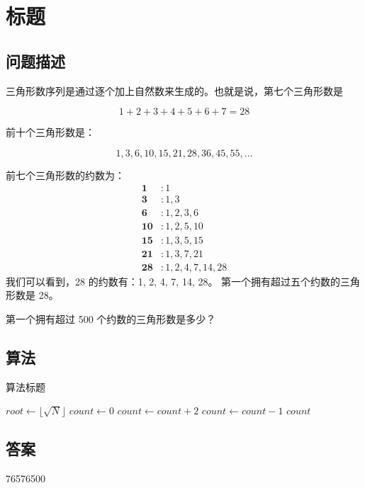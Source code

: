 \section{标题}
\subsection{问题描述}
\begin{tcolorbox}
	三角形数序列是通过逐个加上自然数来生成的。也就是说，第七个三角形数是

	\[
		1 + 2 + 3 + 4 + 5 + 6 + 7 = 28
	\]

	前十个三角形数是：

	\[
		1, 3, 6, 10, 15, 21, 28, 36, 45, 55, \ldots
	\]


	前七个三角形数的约数为：
	\begin{align*}
		\mathbf 1   & \colon 1             \\
		\mathbf 3   & \colon 1,3           \\
		\mathbf 6   & \colon 1,2,3,6       \\
		\mathbf{10} & \colon 1,2,5,10      \\
		\mathbf{15} & \colon 1,3,5,15      \\
		\mathbf{21} & \colon 1,3,7,21      \\
		\mathbf{28} & \colon 1,2,4,7,14,28
	\end{align*}
	我们可以看到，28 的约数有：1, 2, 4, 7, 14, 28。
	第一个拥有超过五个约数的三角形数是 28。

	第一个拥有超过 500 个约数的三角形数是多少？
\end{tcolorbox}

\subsection{算法}
\begin{algorithm}
	\caption{算法标题}
	\begin{algorithmic}[1]
	\State $root \gets \lfloor \sqrt{N} \rfloor$
	\State $ count \gets 0$
	\State $count \gets count + 2$
	\EndFor
	\State $count \gets count - 1$
	\EndIf
	\Return $count$
	\EndFunction
	\end{algorithmic}
\end{algorithm}

\subsection{答案}
76576500
